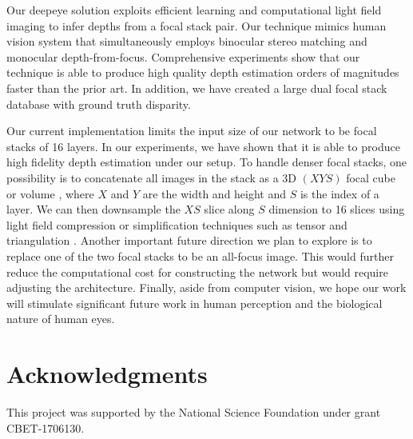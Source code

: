 \documentclass[10pt,twocolumn,letterpaper]{article}
\begin{document}
Our deepeye solution exploits efficient learning and computational light field imaging to infer depths from a focal stack pair. Our technique mimics human vision system that simultaneously employs binocular stereo matching and monocular depth-from-focus. Comprehensive experiments show that our technique is able to produce high quality depth estimation orders of magnitudes faster than the prior art. In addition, we have created a large dual focal stack database with ground truth disparity.

Our current implementation limits the input size of our network to be focal stacks of 16 layers. In our experiments, we have shown that it is able to produce high fidelity depth estimation under our setup. To handle denser focal stacks, one possibility is to concatenate all images in the stack as a 3D $(XYS)$ focal cube or volume \cite{zhou12}, where $X$ and $Y$ are  the width and height and $S$ is the index of a layer. We can then downsample the $XS$ slice along $S$ dimension to 16 slices using light field compression or simplification techniques such as tensor \cite{wanner12} and triangulation \cite{yu13}. Another important future direction we plan to explore is to replace one of the two focal stacks to be an all-focus image. This would further reduce the computational cost for constructing the network but would require adjusting the architecture. Finally, aside from computer vision, we hope our work will stimulate significant future work in human perception and the biological nature of human eyes.

\section{Acknowledgments}

This project was supported by the National Science Foundation under grant CBET-1706130.

%
%
%
%
%
%
%
%
%
%
%
%
%




{\small


}
\end{document}
